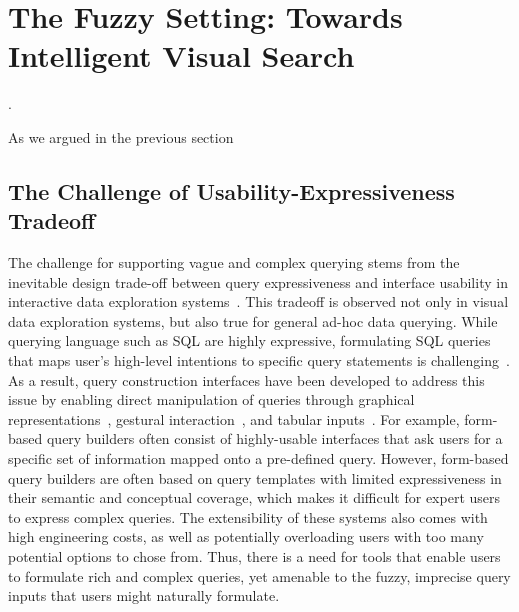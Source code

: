 \section{The Fuzzy Setting: Towards Intelligent Visual Search}\label{sec:vague}
. 
\par As we argued in the previous section 

\subsection{The Challenge of Usability-Expressiveness Tradeoff}
\par The challenge for supporting vague and 
complex querying stems from the inevitable design trade-off between query expressiveness and interface usability in interactive data exploration systems~\cite{Jagadish2007,Morton2014}. This tradeoff is observed not only in visual data exploration systems, but also true for general ad-hoc data querying. While querying language such as SQL are highly expressive, formulating SQL queries that maps user's high-level intentions to specific query statements is challenging~\cite{Jagadish2007,Khoussainova2010}. As a result, query construction interfaces have been developed to address this issue by enabling direct manipulation of queries through graphical representations~\cite{Abouzied2012}, gestural interaction~\cite{Nandi2013}, and tabular inputs~\cite{Zloof1975,Embley1989}. For example, form-based query builders often consist of highly-usable interfaces that ask users for a specific set of information mapped onto a pre-defined query. However, form-based query builders are often based on query templates with limited expressiveness in their semantic and conceptual coverage, which makes it difficult for expert users to express complex queries. The extensibility of these systems also comes with high engineering costs, as well as potentially overloading users with too many potential options to chose from. Thus, there is a need for tools that enable users to formulate rich and complex queries, yet amenable to the fuzzy, imprecise query inputs that users might naturally formulate. 

